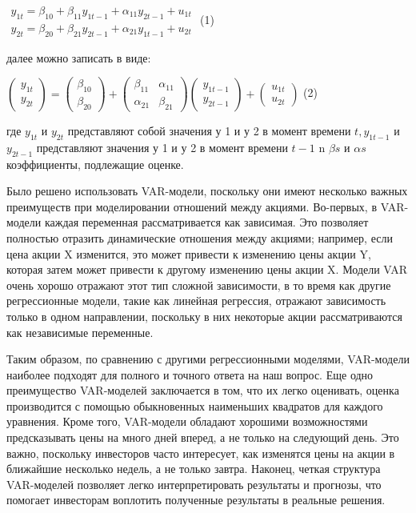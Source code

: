 {\(\begin{matrix}
y_{1t} = \beta_{10} + \beta_{11}y_{1t - 1} + \alpha_{11}y_{2t - 1} + u_{1t} \\
y_{2t} = \beta_{20} + \beta_{21}y_{2t - 1} + \alpha_{21}y_{1t - 1} + u_{2t}
\end{matrix}\) (1)

далее можно записать в виде:

\(\left( \begin{array}{r}
y_{1t} \\
y_{2t}
\end{array} \right) = \left( \begin{array}{r}
\beta_{10} \\
\beta_{20}
\end{array} \right) + \begin{pmatrix}
\beta_{11} & \alpha_{11} \\
\alpha_{21} & \beta_{21}
\end{pmatrix}\left( \begin{array}{r}
y_{1t - 1} \\
y_{2t - 1}
\end{array} \right) + \left( \begin{array}{r}
u_{1t} \\
u_{2t}
\end{array} \right)\) (2)

где \(y_{1t}\) и \(y_{2t}\) представляют собой значения у 1 и у 2 в
момент времени \(t,y_{1t - 1}\) и \(y_{2t - 1}\) представляют значения у
1 и у 2 в момент времени \(t - 1\) n \(\beta s\) и \(\alpha s\)
коэффициенты, подлежащие оценке.

Было решено использовать VAR-модели, поскольку они имеют несколько
важных преимуществ при моделировании отношений между акциями. Во-первых,
в VAR-модели каждая переменная рассматривается как зависимая. Это
позволяет полностью отразить динамические отношения между акциями;
например, если цена акции X изменится, это может привести к изменению
цены акции Y, которая затем может привести к другому изменению цены
акции X. Модели VAR очень хорошо отражают этот тип сложной зависимости,
в то время как другие регрессионные модели, такие как линейная
регрессия, отражают зависимость только в одном направлении, поскольку в
них некоторые акции рассматриваются как независимые переменные.

Таким образом, по сравнению с другими регрессионными моделями,
VAR-модели наиболее подходят для полного и точного ответа на наш вопрос.
Еще одно преимущество VAR-моделей заключается в том, что их легко
оценивать, оценка производится с помощью обыкновенных наименьших
квадратов для каждого уравнения. Кроме того, VAR-модели обладают
хорошими возможностями предсказывать цены на много дней вперед, а не
только на следующий день. Это важно, поскольку инвесторов часто
интересует, как изменятся цены на акции в ближайшие несколько недель, а
не только завтра. Наконец, четкая структура VAR-моделей позволяет легко
интерпретировать результаты и прогнозы, что помогает инвесторам
воплотить полученные результаты в реальные решения.

}
